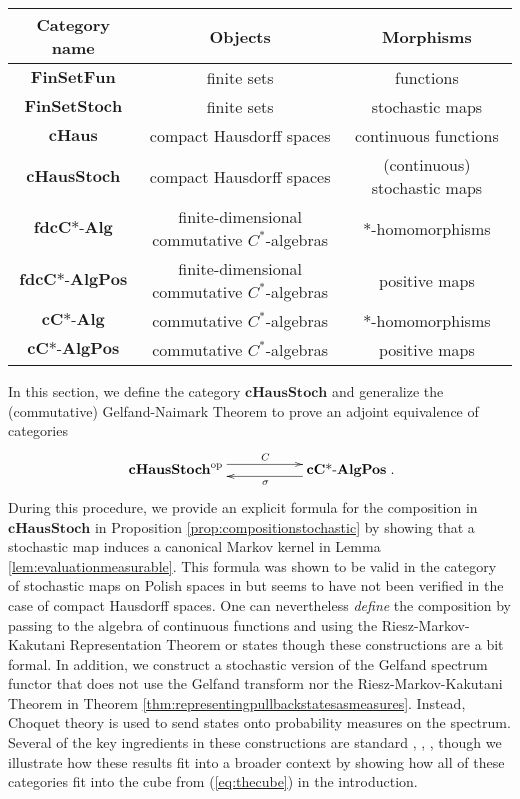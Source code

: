 \documentclass[12pt]{article}
\edef\t{\pgfmathresult}%
\theoremstyle{theorem}
\theoremstyle{definition}
\numberwithin{equation}{section}
\let\s=\sigma \let\t=\tau \let\u=\upsilon \let\f=\phi \let\c=\chi
\newcommand{\be}{\begin{equation}}
\newcommand{\ee}{\end{equation}}
\newcommand{\<}{\langle}
\renewcommand{\>}{\rangle}
\newcommand{\cCAlg}{\mathbf{cC\text{*-}Alg}}
\newcommand{\fdcCAlg}{\mathbf{fdcC\text{*-}Alg}}
\newcommand{\cCAlgPos}{\mathbf{cC\text{*-}AlgPos}}
\newcommand{\fdcCAlgPos}{\mathbf{fdcC\text{*-}AlgPos}}
\newcommand{\FinSetFun}{\mathbf{FinSetFun}}
\newcommand{\FinSetStoch}{\mathbf{FinSetStoch}}
\newcommand{\op}{\mathrm{op}}
\newcommand{\cH}{\mathbf{cHaus}}
\newcommand{\cHStoch}{\mathbf{cHausStoch}}
\begin{document}
\begin{center}
\begin{tabular}{|c|c|c|}
\hline
Category name&Objects&Morphisms\\
\hline
\hline
$\FinSetFun$&finite sets&functions\\
\hline
$\FinSetStoch$&finite sets&stochastic maps\\
\hline
$\cH$&compact Hausdorff spaces&continuous functions\\
\hline
$\cHStoch$&compact Hausdorff spaces&(continuous) stochastic maps\\
\hline
$\fdcCAlg$&finite-dimensional commutative $C^*$-algebras&$*$-homomorphisms\\
\hline
$\fdcCAlgPos$&finite-dimensional commutative $C^*$-algebras&positive maps\\
\hline
$\cCAlg$&commutative $C^*$-algebras&$*$-homomorphisms\\
\hline
$\cCAlgPos$&commutative $C^*$-algebras&positive maps\\
\hline
\end{tabular}
\end{center}

In this section, we define the category $\cHStoch$ and
generalize the (commutative) Gelfand-Naimark Theorem
to prove an adjoint equivalence of categories 
\be
\xymatrix{
\cHStoch^{\op}
\ar@<1.0ex>[rr]^(0.525){C} &&
\ar@<1.0ex>[ll]^(0.475){\s}  \cCAlgPos
}
.
\ee
During this procedure, we provide an explicit formula for the composition
in $\cHStoch$ in Proposition \ref{prop:compositionstochastic}
by showing that a stochastic map induces a canonical 
Markov kernel in Lemma \ref{lem:evaluationmeasurable}. 
This formula was shown to be valid in the category of 
stochastic maps on Polish spaces in \cite{Gi82} 
but seems to have not been verified in the 
case of compact Hausdorff spaces. 
One can nevertheless \emph{define} the composition
by passing to the algebra of continuous functions and using 
the Riesz-Markov-Kakutani Representation Theorem \cite{EFHN15}
or states \cite{FuJa13}
though these constructions are a bit formal.
In addition, we construct a stochastic version of the Gelfand spectrum functor 
that does not use the Gelfand transform 
nor the Riesz-Markov-Kakutani Theorem 
in Theorem \ref{thm:representingpullbackstatesasmeasures}.
Instead, Choquet theory \cite{Ph01} is used to send states
onto probability measures on the spectrum.
Several of the key ingredients in these constructions 
are standard \cite{Ka41}, \cite{Ci06}, \cite{Fo07}, \cite{Fu11}
though we illustrate how these results fit into a broader context
by showing how all of these categories fit into the cube 
from (\ref{eq:thecube}) in the introduction. 
\end{document}
